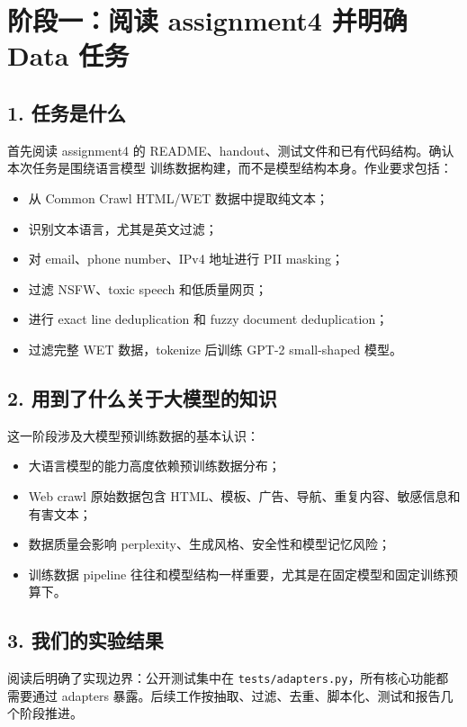 \documentclass[UTF8,11pt]{ctexart}
\begin{document}
\section{阶段一：阅读 assignment4 并明确 Data 任务}

\subsection*{1. 任务是什么}

首先阅读 assignment4 的 README、handout、测试文件和已有代码结构。确认本次任务是围绕语言模型
训练数据构建，而不是模型结构本身。作业要求包括：

\begin{itemize}
  \item 从 Common Crawl HTML/WET 数据中提取纯文本；
  \item 识别文本语言，尤其是英文过滤；
  \item 对 email、phone number、IPv4 地址进行 PII masking；
  \item 过滤 NSFW、toxic speech 和低质量网页；
  \item 进行 exact line deduplication 和 fuzzy document deduplication；
  \item 过滤完整 WET 数据，tokenize 后训练 GPT-2 small-shaped 模型。
\end{itemize}

\subsection*{2. 用到了什么关于大模型的知识}

这一阶段涉及大模型预训练数据的基本认识：

\begin{itemize}
  \item 大语言模型的能力高度依赖预训练数据分布；
  \item Web crawl 原始数据包含 HTML、模板、广告、导航、重复内容、敏感信息和有害文本；
  \item 数据质量会影响 perplexity、生成风格、安全性和模型记忆风险；
  \item 训练数据 pipeline 往往和模型结构一样重要，尤其是在固定模型和固定训练预算下。
\end{itemize}

\subsection*{3. 我们的实验结果}

阅读后明确了实现边界：公开测试集中在 \texttt{tests/adapters.py}，所有核心功能都需要通过 adapters
暴露。后续工作按抽取、过滤、去重、脚本化、测试和报告几个阶段推进。
\end{document}
